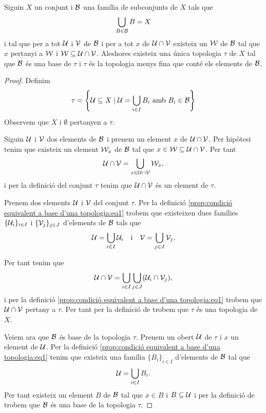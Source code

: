 \documentclass[../Apunts.tex]{subfiles}
\begin{document}
	\begin{proposition}
		\label{prop:condició equivalent a base d'una topologia}
		\label{prop:condició per que una topologia sigui la més fina que conté una base}
		Siguin \(X\) un conjunt i \(\mathcal{B}\) una família de subconjunts de \(X\) tals que
		\[\bigcup_{B\in\mathcal{B}}B=X\]
		i tal que per a tot \(\mathcal{U}\) i \(\mathcal{V}\) de \(\mathcal{B}\) i per a tot \(x\) de \(\mathcal{U}\cap\mathcal{V}\) existeix un \(\mathcal{W}\) de \(\mathcal{B}\) tal que \(x\) pertanyi a \(\mathcal{W}\) i \(\mathcal{W}\subseteq\mathcal{U}\cap\mathcal{V}\).	Aleshores existeix una única topologia \(\tau\) de \(X\) tal que \(\mathcal{B}\) és una base de \(\tau\) i \(\tau\) és la topologia menys fina que conté els elements de \(\mathcal{B}\).
		\begin{proof}
			Definim
			\begin{equation}
				\label{prop:condició equivalent a base d'una topologia:eq1}
				\tau=\left\{\obert{U}\subseteq X\mid\obert{U}=\bigcup_{i\in I}B_{i}\text{ amb }B_{i}\in\base{B}\right\}
			\end{equation}
			Observem que \(X\) i \(\emptyset\) pertanyen a \(\tau\).
			
			Siguin \(\mathcal{U}\) i \(\mathcal{V}\) dos elements de \(\mathcal{B}\) i prenem un element \(x\) de \(\mathcal{U}\cap\mathcal{V}\). Per hipòtesi tenim que existeix un element  \(\mathcal{W}_{x}\) de \(\mathcal{B}\) tal que \(x\in\mathcal{W}\subseteq\mathcal{U}\cap\mathcal{V}\). Per tant
			\[\mathcal{U}\cap\mathcal{V}=\bigcup_{x\in\mathcal{U}\cap\mathcal{V}}\mathcal{W}_{x},\]
			i per la definició del conjunt \(\tau\) tenim que \(\mathcal{U}\cap\mathcal{V}\) és un element de \(\tau\).
			
			Prenem dos elements \(\mathcal{U}\) i \(\mathcal{V}\) del conjunt \(\tau\). Per la definició \eqref{prop:condició equivalent a base d'una topologia:eq1} trobem que existeixen dues famílies \(\{\mathcal{U}_{i}\}_{i\in I}\) i \(\{\mathcal{V}_{j}\}_{j\in J}\) d'elements de \(\mathcal{B}\) tals que
			\[\mathcal{U}=\bigcup_{i\in I}\mathcal{U}_{i}\quad\text{i}\quad\mathcal{V}=\bigcup_{j\in J}\mathcal{V}_{j}.\]
			
			Per tant tenim que
			\[\mathcal{U}\cap\mathcal{V}=\bigcup_{i\in I}\bigcup_{j\in J}(\mathcal{U}_{i}\cap\mathcal{V}_{j}),\]
			i per la definició \eqref{prop:condició equivalent a base d'una topologia:eq1} trobem que \(\mathcal{U}\cap\mathcal{V}\) pertany a \(\tau\). Per tant per la definició de  trobem que \(\tau\) és una topologia de \(X\).
			
			Veiem ara que \(\mathcal{B}\) és base de la topologia \(\tau\). Prenem un obert \(\mathcal{U}\) de \(\tau\) i \(x\) un element de \(\mathcal{U}\). Per la definició \eqref{prop:condició equivalent a base d'una topologia:eq1} tenim que existeix una família \(\{B_{i}\}_{i\in I}\) d'elements de \(\mathcal{B}\) tal que
			\[\mathcal{U}=\bigcup_{i\in I}B_{i}.\]
			Per tant existeix un element \(B\) de \(\mathcal{B}\) tal que \(x\in B\) i \(B\subseteq\mathcal{U}\) i per la definició de  trobem que \(\mathcal{B}\) és una base de la topologia \(\tau\).
			

\end{proof}
\end{proposition}
\end{document}
